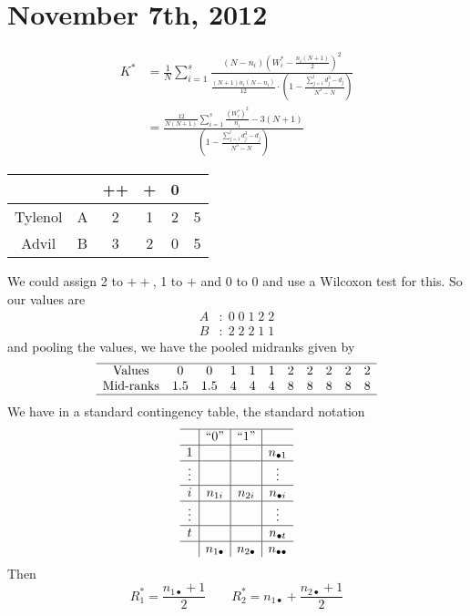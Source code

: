 \documentclass[a4paper,12pt]{amsart}
\begin{document}
\section{November 7th, 2012}
\begin{align*}
K^* &= \frac{1}{N}\sum_{i=1}^s \frac{(N-n_i)\left(W_i^* - \frac{n_i(N+1)}{2}\right)^2}{\frac{(N+1)n_i(N-n_i)}{12} \cdot \left(1 - \frac{\sum_{j=1}^l d_j^3 - d_j}{N^3 - N}\right)}\\
&= \frac{\frac{12}{N(N+1)}\sum_{i=1}^s \frac{(W_i^*)^2}{n_i} - 3(N+1)}{\left(1 - \frac{\sum_{j=1}^l d_j^3 - d_j}{N^3 - N}\right)}
\end{align*}

\bigskip 
\begin{center}
\begin{tabular}{cc|ccc|c}
\hline
 & & ++ & + & 0 & \\
 \hline
 Tylenol & A & 2 & 1 & 2 & 5\\
 Advil & B & 3 & 2 & 0 & 5\\
\hline
\end{tabular}
\end{center}
\bigskip
We could assign 2 to $++$, 1 to $+$ and 0 to 0 and use a Wilcoxon test for this. So our values are 
\begin{align*}
A&: \; 0 \; 0 \; 1 \; 2 \; 2\\
B&: \; 2 \; 2\; 2 \; 1 \;1 
\end{align*}
and pooling the values, we have the pooled midranks given by
\[\begin{array}{ccccccccccc}
\hline
\text{Values}&0 & 0 & 1 & 1 & 1  & 2 & 2 & 2 & 2 & 2\\
\text{Mid-ranks}&1.5 & 1.5 & 4 & 4 & 4 & 8 & 8 & 8 & 8 & 8 \\
\hline
\end{array} \]
We have in a standard contingency table, the standard notation
\[\begin{array}{c|c|c|c}
\hline
& \text{``0''} & \text{``1''} & \\ \hline
1 & & & n_{\bullet 1}\\ \hline
\vdots & & & \vdots\\ \hline
i &n_{1i} &n_{2i}& n_{\bullet i}\\ \hline
\vdots & & & \vdots\\ \hline
t & & & n_{\bullet t}\\ \hline
& n_{1 \bullet} & n_{2 \bullet} & n_{\bullet \bullet}
\end{array}\]
Then
\[R_1^* = \frac{n_{1 \bullet} + 1}{2} \qquad R_2^* = n_{1 \bullet} + \frac{n_{2 \bullet} + 1}{2}\]
\end{document}
